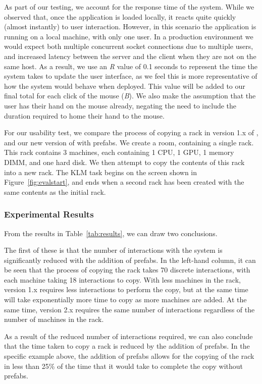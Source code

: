 \documentclass[11pt]{article}
\begin{document}
			As part of our testing, we account for the response time of the system. 
			While we observed that, once the application is loaded locally, it reacts quite quickly (almost instantly) to user interaction.
			However, in this scenario the application is running on a local machine, with only one user.
			In a production environment we would expect both multiple concurrent socket connections due to multiple users, and increased latency between the server and the client when they are not on the same host. 
			As a result, we use an \textit{R} value of 0.1 seconds to represent the time the system takes to update the user interface, as we feel this is more representative of how the system would behave when deployed.
			This value will be added to our final total for each click of the mouse (\textit{B}).
			We also make the assumption that the user has their hand on the mouse already, negating the need to include the duration required to home their hand to the mouse.

			For our usability test, we compare the process of copying a rack in version 1.x of \opendc{}, and our new version of \opendc{} with prefabs.
			We create a room, containing a single rack.
			This rack contains 3 machines, each containing 1 CPU, 1 GPU, 1 memory DIMM, and one hard disk.
			We then attempt to copy the contents of this rack into a new rack.
			The KLM task begins on the screen shown in Figure~\ref{fig:evalstart}, and ends when a second rack has been created with the same contents as the initial rack.
			

		\subsubsection{Experimental Results}
			

			From the results in Table~\ref{tab:results}, we can draw two conclusions.

			The first of these is that the number of interactions with the system is significantly reduced with the addition of prefabs.
			In the left-hand column, it can be seen that the process of copying the rack takes 70 discrete interactions, with each machine taking 18 interactions to copy.
			With less machines in the rack, version 1.x requires less interactions to perform the copy, but at the same time will take exponentially more time to copy as more machines are added.
			At the same time, version 2.x requires the same number of interactions regardless of the number of machines in the rack.

			As a result of the reduced number of interactions required, we can also conclude that the time taken to copy a rack is reduced by the addition of prefabs.
			In the specific example above, the addition of prefabs allows for the copying of the rack in less than 25\% of the time that it would take to complete the copy without prefabs.
\end{document}
